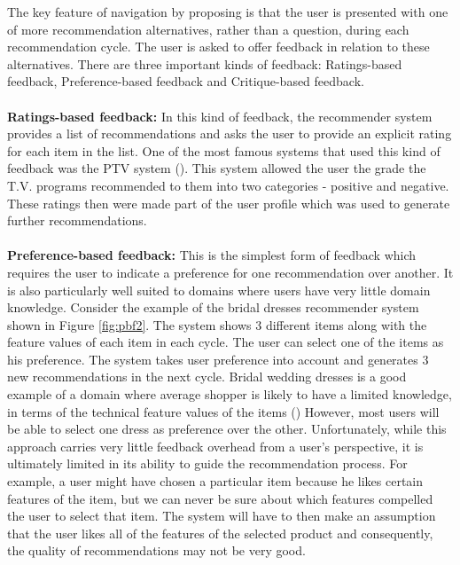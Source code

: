 The key feature of navigation by proposing is that the user is presented with one of more recommendation alternatives, rather than a question, during each recommendation cycle. 
The user is asked to offer feedback in relation to these alternatives.
There are three important kinds of feedback: Ratings-based feedback, Preference-based feedback and Critique-based feedback.\\
\\
\textbf{Ratings-based feedback:} In this kind of feedback, the recommender system provides a list of recommendations and  asks the user to provide an explicit rating for each item in the list.
One of the most famous systems that used this kind of feedback was the PTV system (\cite{smyth99tv}).
This system allowed the user the grade the T.V. programs recommended to them into two categories - positive and negative. 
These ratings then were made part of the user profile which was used to generate further recommendations.\\
\\
\textbf{Preference-based feedback:} This is the simplest form of feedback which requires the user to indicate a preference for one recommendation over another. 
It is also particularly well suited to domains where users have very little domain knowledge.
Consider the example of the bridal dresses recommender system shown in Figure \ref{fig:pbf2}. 
The system shows 3 different items along with the feature values of each item in each cycle. 
The user can select one of the items as his preference.
The system takes user preference into account and generates 3 new recommendations in the next cycle.
Bridal wedding dresses is a good example of a domain where average shopper is likely to have a limited knowledge, in terms of the technical feature values of the items (\cite{smyth2007})
However, most users will be able to select one dress as preference over the other.
Unfortunately, while this approach carries very little feedback overhead from a user’s perspective, it is ultimately limited in its ability to guide the recommendation process.
For example, a user might have chosen a particular item because he likes certain features of the item, but we can never be sure about which features compelled the user to select that item.
The system will have to then make an assumption that the user likes all of the features of the selected product and consequently, the quality of recommendations may not be very good.

